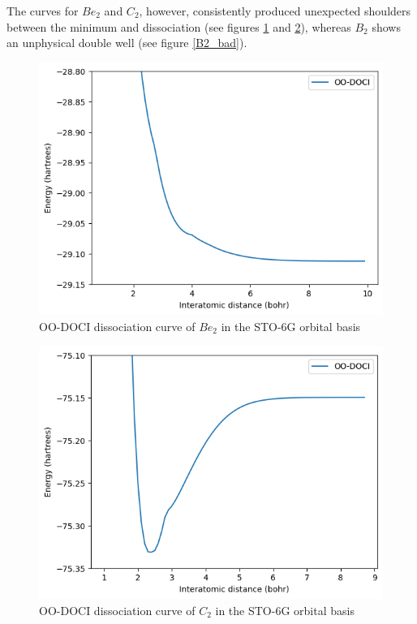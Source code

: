 \documentclass[twoside,twocolumn,9pt]{article}
\begin{document}
The curves for $Be_2$ and $C_2$, however, consistently produced unexpected shoulders between the minimum and dissociation (see figures \ref{Be2_bad} and \ref{C2_bad}), whereas $B_2$ shows an unphysical double well (see figure \ref{B2_bad}).

\begin{figure}[h]
  \includegraphics[width=\linewidth]{Be2.png}
  \caption{OO-DOCI dissociation curve of $Be_2$ in the STO-6G orbital basis}\label{Be2_bad}
\end{figure}

\begin{figure}[h]
  \includegraphics[width=\linewidth]{C2.png}
  \caption{OO-DOCI dissociation curve of $C_2$ in the STO-6G orbital basis}\label{C2_bad}
\end{figure}
\end{document}
